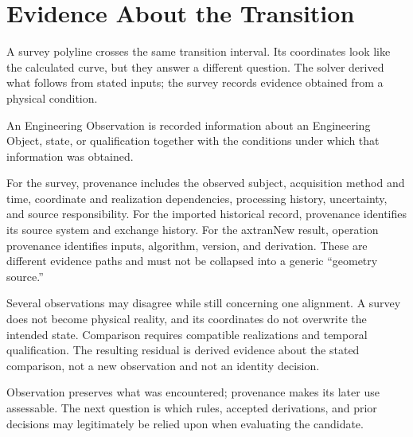 
\chapter{Evidence About the Transition}
\label{chap:engineering-observations}

A survey polyline crosses the same transition interval. Its coordinates look
like the calculated curve, but they answer a different question. The solver
derived what follows from stated inputs; the survey records evidence obtained
from a physical condition.

\begin{definition}
\label{def:engineering-observation}
An Engineering Observation is recorded information about an Engineering
Object, state, or qualification together with the conditions under which that
information was obtained.
\end{definition}

For the survey, provenance includes the observed subject, acquisition method
and time, coordinate and realization dependencies, processing history,
uncertainty, and source responsibility. For the imported historical record,
provenance identifies its source system and exchange history. For the
axtranNew result, operation provenance identifies inputs, algorithm, version,
and derivation. These are different evidence paths and must not be collapsed
into a generic ``geometry source.''

Several observations may disagree while still concerning one alignment. A
survey does not become physical reality, and its coordinates do not overwrite
the intended state. Comparison requires compatible realizations and temporal
qualification. The resulting residual is derived evidence about the stated
comparison, not a new observation and not an identity decision.

Observation preserves what was encountered; provenance makes its later use
assessable. The next question is which rules, accepted derivations, and prior
decisions may legitimately be relied upon when evaluating the candidate.
